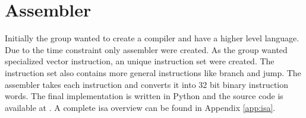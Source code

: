 \section{Assembler}
Initially the group wanted to create a compiler and have a higher level language.
Due to the time constraint only assembler were created.
As the group wanted specialized vector instruction, an unique instruction set were created.
The instruction set also contains more general instructions like branch and jump.
The assembler takes each instruction and converts it into 32 bit binary instruction words.
The final implementation is written in Python and the source code is available at \cite{assembler}.
A complete \gls{isa} overview can be found in Appendix \ref{app:isa}.
